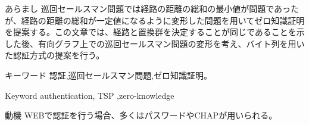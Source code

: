 あらまし 
巡回セールスマン問題では経路の距離の総和の最小値が問題であったが、経路の距離の総和が一定値になるように変形した問題を用いてゼロ知識証明を提案する。この文章では、経路と置換群を決定することが同じであることを示した後、有向グラフ上での巡回セールスマン問題の変形を考え、バイト列を用いた認証方式の提案を行う。

キーワード
認証,巡回セールスマン問題,ゼロ知識証明。

Keyword
authentication, TSP ,zero-knowledge

動機
WEBで認証を行う場合、多くはパスワードやCHAPが用いられる。
